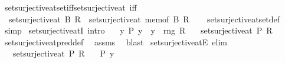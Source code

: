 \begin{isabellebody}
\isamarkupfalse%
\isanewline
\isanewline
{}\isamarkupfalse%
\ set{\isacharunderscore}{\kern0pt}surjective{\isacharunderscore}{\kern0pt}at{\isacharunderscore}{\kern0pt}set{\isacharunderscore}{\kern0pt}iff{\isacharunderscore}{\kern0pt}set{\isacharunderscore}{\kern0pt}surjective{\isacharunderscore}{\kern0pt}at\ {\isacharbrackleft}{\kern0pt}iff{\isacharbrackright}{\kern0pt}{\isacharcolon}{\kern0pt}\isanewline
\ \ {\isachardoublequoteopen}set{\isacharunderscore}{\kern0pt}surjective{\isacharunderscore}{\kern0pt}at\ B\ R\ {\isasymlongleftrightarrow}\ set{\isacharunderscore}{\kern0pt}surjective{\isacharunderscore}{\kern0pt}at\ {\isacharparenleft}{\kern0pt}mem{\isacharunderscore}{\kern0pt}of\ B{\isacharparenright}{\kern0pt}\ R{\isachardoublequoteclose}\isanewline
%
\isadelimproof
\ \ %
\endisadelimproof
%
\isatagproof
{}\isamarkupfalse%
\ set{\isacharunderscore}{\kern0pt}surjective{\isacharunderscore}{\kern0pt}at{\isacharunderscore}{\kern0pt}set{\isacharunderscore}{\kern0pt}def\ \isamarkupfalse%
\ simp%
\endisatagproof
{\isafoldproof}%
%
\isadelimproof
\isanewline
%
\endisadelimproof
\isanewline
{}\isamarkupfalse%
\ set{\isacharunderscore}{\kern0pt}surjective{\isacharunderscore}{\kern0pt}atI\ {\isacharbrackleft}{\kern0pt}intro{\isacharbrackright}{\kern0pt}{\isacharcolon}{\kern0pt}\isanewline
\ \ \ {\isachardoublequoteopen}{\isasymAnd}y{\isachardot}{\kern0pt}\ P\ y\ {\isasymLongrightarrow}\ y\ {\isasymin}\ rng\ R{\isachardoublequoteclose}\isanewline
\ \ \ {\isachardoublequoteopen}set{\isacharunderscore}{\kern0pt}surjective{\isacharunderscore}{\kern0pt}at\ P\ R{\isachardoublequoteclose}\isanewline
%
\isadelimproof
\ \ %
\endisadelimproof
%
\isatagproof
{}\isamarkupfalse%
\ set{\isacharunderscore}{\kern0pt}surjective{\isacharunderscore}{\kern0pt}at{\isacharunderscore}{\kern0pt}pred{\isacharunderscore}{\kern0pt}def\ \isamarkupfalse%
\ assms\ \isamarkupfalse%
\ blast%
\endisatagproof
{\isafoldproof}%
%
\isadelimproof
\isanewline
%
\endisadelimproof
\isanewline
{}\isamarkupfalse%
\ set{\isacharunderscore}{\kern0pt}surjective{\isacharunderscore}{\kern0pt}atE\ {\isacharbrackleft}{\kern0pt}elim{\isacharbrackright}{\kern0pt}{\isacharcolon}{\kern0pt}\isanewline
\ \ \ {\isachardoublequoteopen}set{\isacharunderscore}{\kern0pt}surjective{\isacharunderscore}{\kern0pt}at\ P\ R{\isachardoublequoteclose}\isanewline
\ \ \ {\isachardoublequoteopen}P\ y{\isachardoublequoteclose}\isanewline

\end{isabellebody}
